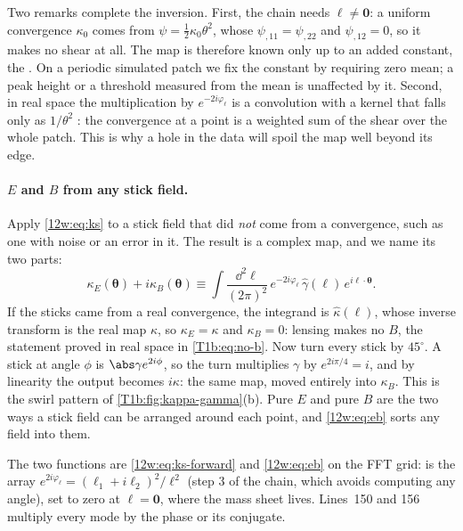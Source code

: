 Two remarks complete the inversion. First, the chain needs $\bm\ell\neq\bm0$: a uniform convergence $\kappa_0$
comes from $\psi=\frac12\kappa_0\theta^2$, whose $\psi_{,11}=\psi_{,22}$ and $\psi_{,12}=0$, so it makes no shear
at all. The map is therefore known only up to an added constant, the 
. On a periodic simulated patch we fix the constant by requiring zero mean;
a peak height or a threshold measured from the mean is unaffected by it. Second, in real space the multiplication
by $e^{-2i\varphi_\ell}$ is a convolution with a kernel that falls only as $1/\theta^2$
: the convergence at a point is a weighted sum of the shear over the whole
patch. This is why a hole in the data will spoil the map well beyond its edge.

\paragraph{$E$ and $B$ from any stick field.}
Apply \eqref{12w:eq:ks} to a stick field that did \emph{not} come from a convergence, such as one with noise or an
error in it. The result is a complex map, and we name its two parts:
\begin{equation}
\kappa_E(\bm\theta)+i\kappa_B(\bm\theta)\equiv\int\!\frac{\dd^2\ell}{(2\pi)^2}\,e^{-2i\varphi_\ell}\,
\hat\gamma(\bm\ell)\,e^{i\bm\ell\cdot\bm\theta}.
\label{12w:eq:eb}
\end{equation}
If the sticks came from a real convergence, the integrand is $\hat\kappa(\bm\ell)$, whose inverse transform is the
real map $\kappa$, so $\kappa_E=\kappa$ and $\kappa_B=0$: lensing makes no $B$, the statement proved in real space
in \eqref{T1b:eq:no-b}. Now turn every stick by $45^\circ$. A stick at angle $\phi$ is $\abs\gamma e^{2i\phi}$, so the
turn multiplies $\gamma$ by $e^{2i\pi/4}=i$, and by linearity the output becomes $i\kappa$: the same map, moved
entirely into $\kappa_B$. This is the swirl pattern of \cref{T1b:fig:kappa-gamma}(b). Pure $E$ and pure $B$ are the
two ways a stick field can be arranged around each point, and \eqref{12w:eq:eb} sorts any field into them.


The two functions are \eqref{12w:eq:ks-forward} and \eqref{12w:eq:eb} on the FFT grid:  is the array
$e^{2i\varphi_\ell}=(\ell_1+i\ell_2)^2/\ell^2$ (step 3 of the chain, which avoids computing any angle), set to zero
at $\bm\ell=\bm0$, where the mass sheet lives. Lines~150 and 156 multiply every mode by the phase or its conjugate.

